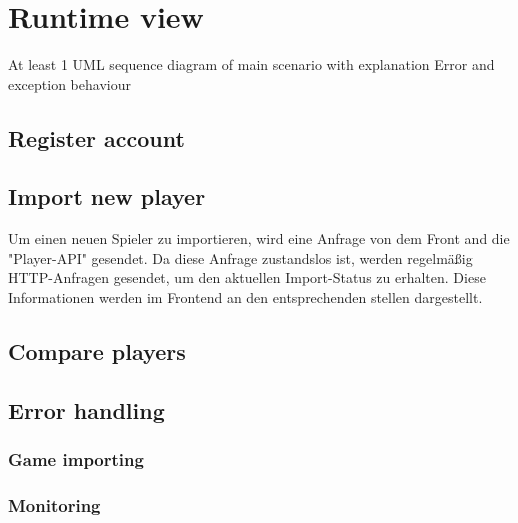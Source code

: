 \section{Runtime view}
At least 1 UML sequence diagram of main scenario with explanation
Error and exception behaviour
\subsection{Register account}

\subsection{Import new player}

Um einen neuen Spieler zu importieren, wird eine Anfrage von dem Front and die "Player-API" gesendet. Da diese Anfrage zustandslos ist, werden regelmäßig HTTP-Anfragen gesendet, um den aktuellen Import-Status 
zu erhalten. Diese Informationen werden im Frontend an den entsprechenden stellen dargestellt.


\subsection{Compare players}

\subsection{Error handling}
\subsubsection{Game importing}
\subsubsection{Monitoring}